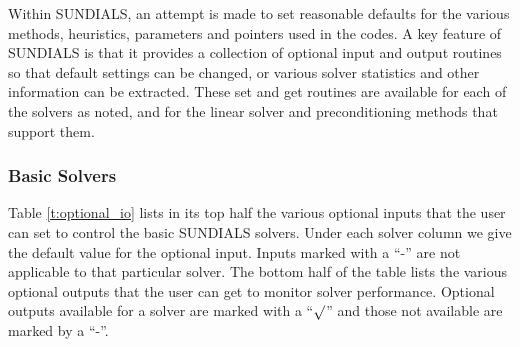 Within SUNDIALS, an attempt is made to set reasonable defaults for the
various methods, heuristics, parameters and pointers used in the
codes. 
A key feature of SUNDIALS is that it provides a collection of optional
input and output routines so that default settings can be changed, or
various solver statistics and other information can be extracted.
These set and get routines are available for each of the solvers as
noted, and for the linear solver and preconditioning methods that
support them.

\subsubsection*{Basic Solvers} 
Table \ref{t:optional_io} lists in its top half the various optional 
inputs that the user can set to control the basic SUNDIALS solvers.
Under each solver column we give the default value for the optional 
input. Inputs marked with a ``-'' are not applicable to that particular 
solver. The bottom half of the table lists the various optional 
outputs that the user can get to monitor solver performance.
Optional outputs available for a solver are marked with a ``$\surd$''
and those not available are marked by a ``-''.


